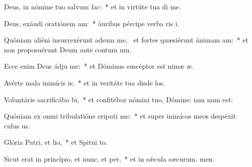 \item Deus, in nómine tuo salvum  fac:~* et in virtúte tua di me.
\item Deus, exáudi oratiónem am:~* áuribus pércipe verba ris i.
\item Quóniam aliéni insurrexérunt adsum me,~\pscross{} et fortes quæsiérunt ánimam am:~* et non proposuérunt Deum ante contum um.
\item Ecce enim Deus ádju me:~* et Dóminus suscéptor est nimæ æ.
\item Avérte mala inimícis is:~* et in veritáte tua disde los.
\item Voluntárie sacrificábo bi,~* et confitébor nómini tuo, Dómine: iam num est:
\item Quóniam ex omni tribulatióne eriputi me:~* et super inimícos meos despéxit culus us.
\item Glória Patri, et lio,~* et Spitui to.
\item Sicut erat in princípio, et nunc, et per,~* et in sǽcula sæcurum. men.
